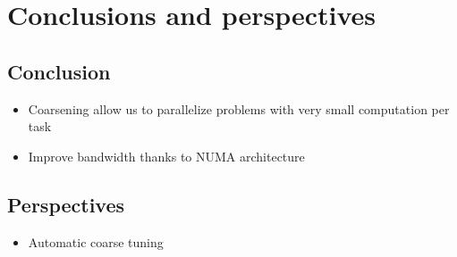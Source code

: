 \documentclass[oneside,12t]{classes/Thesis}
\begin{document}




\chapter{Conclusions and perspectives}
\minitoc
\vspace{1cm}
\section{Conclusion}
  \begin{itemize}
    \item Coarsening allow us to parallelize problems with very small computation per task
    \item Improve bandwidth thanks to NUMA architecture
  \end{itemize}


\section{Perspectives}
  \begin{itemize}
    \item Automatic coarse tuning
  \end{itemize}



\backmatter %
%
\appendix



\end{document}
